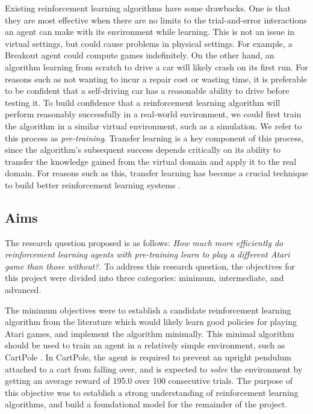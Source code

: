\documentclass[12pt,a4paper]{article}
\begin{document}
Existing reinforcement learning algorithms have some drawbacks. One is that they are most effective when there are no limits to the trial-and-error interactions an agent can make with its environment while learning. This is not an issue in virtual settings, but could cause problems in physical settings. For example, a Breakout agent could compute games indefinitely. On the other hand, an algorithm learning from scratch to drive a car will likely crash on its first run. For reasons such as not wanting to incur a repair cost or wasting time, it is preferable to be confident that a self-driving car has a reasonable ability to drive before testing it. To build confidence that a reinforcement learning algorithm will perform reasonably successfully in a real-world environment, we could first train the algorithm in a similar virtual environment, such as a simulation. We refer to this process as \textit{pre-training}. Transfer learning is a key component of this process, since the algorithm's subsequent success depends critically on its ability to transfer the knowledge gained from the virtual domain and apply it to the real domain. For reasons such as this, transfer learning has become a crucial technique to build better reinforcement learning systems \cite{}. 

\subsection{Aims}
The research question proposed is as follows: \textit{How much more efficiently do reinforcement learning agents with pre-training learn to play a different Atari game than those without?}. To address this research question, the objectives for this project were divided into three categories: minimum, intermediate, and advanced. 

The minimum objectives were to establish a candidate reinforcement learning algorithm from the literature which would likely learn good policies for playing Atari games, and implement the algorithm minimally. This minimal algorithm should be used to train an agent in a relatively simple environment, such as CartPole \cite{}. In CartPole, the agent is required to prevent an upright pendulum attached to a cart from falling over, and is expected to \textit{solve} the environment by getting an average reward of 195.0 over 100 consecutive trials. The purpose of this objective was to establish a strong understanding of reinforcement learning algorithms, and build a foundational model for the remainder of the project.
\end{document}
